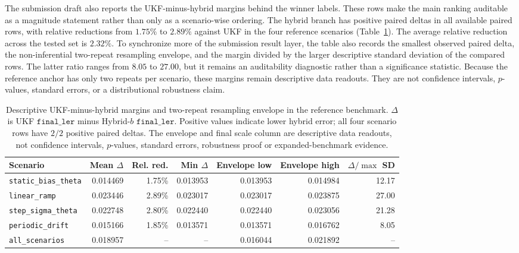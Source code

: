 \documentclass[11pt]{article}
\begin{document}
The submission draft also reports the UKF-minus-hybrid margins behind the
winner labels.  These rows make the main ranking auditable as a magnitude
statement rather than only as a scenario-wise ordering.  The hybrid branch has
positive paired deltas in all available paired rows, with relative reductions
from \(1.75\%\) to \(2.89\%\) against UKF in the four reference scenarios
(Table~\ref{tab:paired-margin-note}).  The average relative reduction across
the tested set is \(2.32\%\).  To synchronize more of the submission result
layer, the table also records the smallest observed paired delta, the
non-inferential two-repeat resampling envelope, and the margin divided by the
larger descriptive standard deviation of the compared rows.  The latter ratio
ranges from \(8.05\) to \(27.00\), but it remains an auditability diagnostic
rather than a significance statistic.  Because the reference anchor has only two
repeats per scenario, these margins remain descriptive data readouts.
They are not confidence intervals, \(p\)-values, standard errors, or a
distributional robustness claim.

\begin{table}[ht]
\centering
\scriptsize
\begin{tabular}{lrrrrrr}
\toprule
Scenario & Mean \(\Delta\) & Rel. red. & Min \(\Delta\) & Envelope low & Envelope high & \(\Delta/\max\) SD \\
\midrule
\texttt{static\_bias\_theta} & 0.014469 & 1.75\% & 0.013953 & 0.013953 & 0.014984 & 12.17 \\
\texttt{linear\_ramp} & 0.023446 & 2.89\% & 0.023017 & 0.023017 & 0.023875 & 27.00 \\
\texttt{step\_sigma\_theta} & 0.022748 & 2.80\% & 0.022440 & 0.022440 & 0.023056 & 21.28 \\
\texttt{periodic\_drift} & 0.015166 & 1.85\% & 0.013571 & 0.013571 & 0.016762 & 8.05 \\
\texttt{all\_scenarios} & 0.018957 & -- & -- & 0.016044 & 0.021892 & -- \\
\bottomrule
\end{tabular}
\caption{Descriptive UKF-minus-hybrid margins and two-repeat resampling
envelope in the reference benchmark.  \(\Delta\) is UKF \(\texttt{final\_ler}\)
minus Hybrid-\(b\) \(\texttt{final\_ler}\).  Positive values indicate lower
hybrid error; all four scenario rows have \(2/2\) positive paired deltas.  The
envelope and final scale column are descriptive data readouts, not
confidence intervals, \(p\)-values, standard errors, robustness proof or
expanded-benchmark evidence.}
\label{tab:paired-margin-note}
\end{table}
\end{document}
